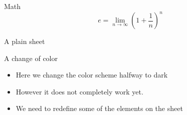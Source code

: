\documentclass[12pt, dutch]{beamer}
\begin{document}
\begin{frame}{Math}
  \begin{equation*}
    e = \lim_{n\to \infty} \left(1 + \frac{1}{n}\right)^n
  \end{equation*}
\end{frame}

\begin{frame}[plain]
  A plain sheet
\end{frame}
 
\begin{frame}{A change of color}
\begin{itemize}
  \item Here we change the color scheme halfway to dark
    \item However it does not completely work yet.
    \item We need to redefine some of the elements on the sheet
\end{itemize}   
\end{frame}
\end{document}
